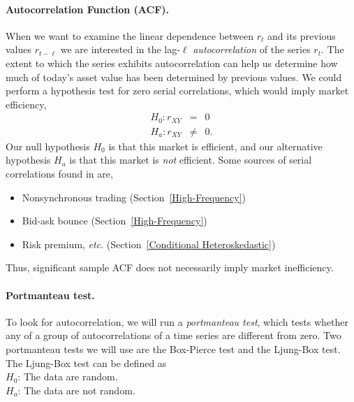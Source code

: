 \paragraph{Autocorrelation Function (ACF).} When we want to examine the linear dependence between $r_t$ and its previous values $r_{t-\ell}$ we are interested in the lag-$\ell$ \emph{autocorrelation} of the series $r_t$.
\marginpar{\begin{small}\begin{flushleft}\textcolor{blue}{Existence of serial correlations implies that the return is predictable, indicating market inefficiency.}\end{flushleft}\end{small}}
The extent to which the series exhibits autocorrelation can help us determine how much of today's asset value has been determined by previous values. We could perform a hypothesis test for zero serial correlations, which would imply market efficiency,
\begin{eqnarray*}
H_0 : r_{XY} &=& 0 \\
H_a : r_{XY} &\ne& 0.
\end{eqnarray*}
Our null hypothesis $H_0$ is that this market is efficient, and our alternative hypothesis $H_a$ is that this market is \emph{not} efficient. Some sources of serial correlations found in \fts{} are,
\begin{itemize}
\item Nonsynchronous trading (Section~\ref{High-Frequency}) 
\item Bid-ask bounce (Section~\ref{High-Frequency}) 
\item Risk premium, \textit{etc}. (Section~\ref{Conditional Heteroskedastic})
\end{itemize}
Thus, significant sample ACF does not necessarily imply market 
inefficiency. 

\paragraph{Portmanteau test.} To look for autocorrelation, we will run a \emph{portmanteau test}, which tests whether any of a group of autocorrelations of a time series are different from zero. Two portmanteau tests we will use are the Box-Pierce test and the Ljung-Box test. The Ljung-Box test can be defined as \\
$H_0$: 	The data are random. \\
$H_a$: 	The data are not random.
\bigskip

